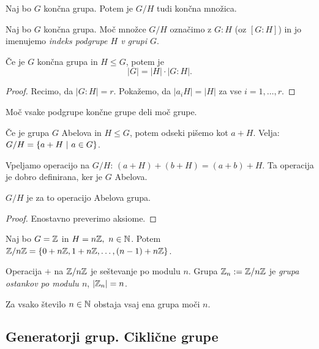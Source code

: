 \begin{opomba}
    Naj bo $G$ končna grupa. Potem je $G/H$ tudi končna množica.
\end{opomba}

\begin{definicija}
    Naj bo $G$ končna grupa. Moč množce $G/H$ označimo z $G:H$ (oz $[G:H]$) in jo imenujemo \emph{indeks podgrupe $H$ v grupi $G$}.
\end{definicija}

\begin{izrek}
    Če je $G$ končna grupa in $H \leq G$, potem je 
    $$|G| = |H| \cdot |G:H|.$$
\end{izrek}

\begin{proof}
    Recimo, da $|G:H| = r$. Pokažemo, da $|a_iH| = |H|$ za vse $i = 1, \ldots, r$.
\end{proof}

\begin{posledica}
    Moč vsake podgrupe končne grupe deli moč grupe.
\end{posledica}

\begin{opomba}
    Če je grupa $G$ Abelova in $H \leq G$, potem odseki pišemo kot $a + H$. Velja: $G/H = \left\{a+H \ | \ a \in G\right\}$.

    Vpeljamo operacijo na $G/H$: $(a+H) + (b+H) = (a + b) + H$. Ta operacija je dobro definirana, ker je $G$ Abelova.
\end{opomba}

\begin{trditev}
    $G/H$ je za to operacijo Abelova grupa.
\end{trditev}

\begin{proof}
    Enostavno preverimo aksiome.
\end{proof}

\begin{primer}
    Naj bo $G = \mathbb{Z}$ in $H = n\mathbb{Z}, \ n \in \mathbb{N}$. Potem $\mathbb{Z}/{n\mathbb{Z}} = \left\{0 + n\mathbb{Z}, 1 + n\mathbb{Z}, \ldots, (n-1) + n\mathbb{Z}\right\}$.

    Operacija $+$ na $\mathbb{Z}/{n\mathbb{Z}}$ je seštevanje po modulu $n$. Grupa $\mathbb{Z}_n := \mathbb{Z}/{n\mathbb{Z}}$ je \emph{grupa ostankov po modulu $n$}, $|\mathbb{Z}_n| = n$.
\end{primer}
\begin{posledica}
    Za vsako število $n \in \mathbb{N}$ obstaja vsaj ena grupa moči $n$.
\end{posledica}

\newpage
\subsection{Generatorji grup. Ciklične grupe}